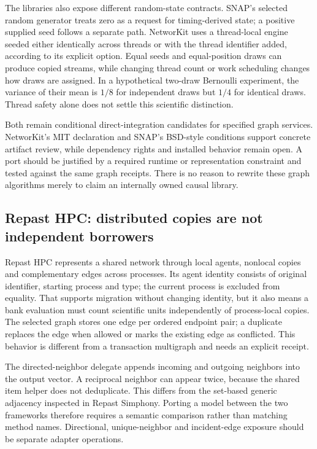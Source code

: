 The libraries also expose different random-state contracts. SNAP's selected random generator treats zero as a request for timing-derived state; a positive supplied seed follows a separate path. NetworKit uses a thread-local engine seeded either identically across threads or with the thread identifier added, according to its explicit option. Equal seeds and equal-position draws can produce copied streams, while changing thread count or work scheduling changes how draws are assigned. In a hypothetical two-draw Bernoulli experiment, the variance of their mean is $1/8$ for independent draws but $1/4$ for identical draws. Thread safety alone does not settle this scientific distinction.\citep{exec25_cnet_snap,exec25_cnet_networkit,exec25_cnet_choice}

Both remain conditional direct-integration candidates for specified graph services. NetworKit's MIT declaration and SNAP's BSD-style conditions support concrete artifact review, while dependency rights and installed behavior remain open. A port should be justified by a required runtime or representation constraint and tested against the same graph receipts. There is no reason to rewrite these graph algorithms merely to claim an internally owned causal library.\citep{exec25_cnet_networkit,exec25_cnet_snap,exec25_cnet_choice}

\subsection{Repast HPC: distributed copies are not independent borrowers}

Repast HPC represents a shared network through local agents, nonlocal copies and complementary edges across processes. Its agent identity consists of original identifier, starting process and type; the current process is excluded from equality. That supports migration without changing identity, but it also means a bank evaluation must count scientific units independently of process-local copies. The selected graph stores one edge per ordered endpoint pair; a duplicate replaces the edge when allowed or marks the existing edge as conflicted. This behavior is different from a transaction multigraph and needs an explicit receipt.\citep{exec25_cnet_repast}

The directed-neighbor delegate appends incoming and outgoing neighbors into the output vector. A reciprocal neighbor can appear twice, because the shared item helper does not deduplicate. This differs from the set-based generic adjacency inspected in Repast Simphony. Porting a model between the two frameworks therefore requires a semantic comparison rather than matching method names. Directional, unique-neighbor and incident-edge exposure should be separate adapter operations.\citep{exec25_cnet_repast,exec25_cnet_choice}

